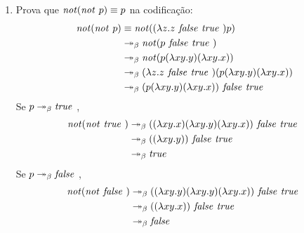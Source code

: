 \documentclass[../main.tex]{subfiles}
\begin{document}
\begin{enumerate}
    \item Prova que $\text{\emph{not}}(\text{\emph{not }} p)\equiv p$ na codificação:
    \begin{equation*}
        \begin{split}
            \text{\emph{not}}(\text{\emph{not }} p) & \equiv \text{\emph{not}}((\lambda z . z \text{\emph{ false }} \text{\emph{true }}) p)
                                   \\ & \twoheadrightarrow_{\beta} \text{\emph{not}}(p \text{\emph{ false }} \text{\emph{true }})
                                   \\ & \twoheadrightarrow_{\beta} \text{\emph{not}}(p (\lambda xy . y) (\lambda xy . x))
                                   \\ & \twoheadrightarrow_{\beta} (\lambda z . z \text{\emph{ false }} \text{\emph{true }})(p (\lambda xy . y) (\lambda xy . x))
                                   \\ & \twoheadrightarrow_{\beta} (p (\lambda xy . y) (\lambda xy . x)) \text{\emph{ false }} \text{\emph{true }}
        \end{split}
    \end{equation*}
    Se $p \twoheadrightarrow_{\beta} \text{\emph{true }}$,
    \begin{equation*}
        \begin{split}
            \text{\emph{not}}(\text{\emph{not }} \text{\emph{true }}) & \twoheadrightarrow_{\beta} ((\lambda xy . x) (\lambda xy . y) (\lambda xy . x)) \text{\emph{ false }} \text{\emph{true }} \\ & \twoheadrightarrow_{\beta} ((\lambda xy . y)) \text{\emph{ false }} \text{\emph{true }} \\ & \twoheadrightarrow_{\beta} \text{\emph{true }}
        \end{split}
    \end{equation*}
    Se $p \twoheadrightarrow_{\beta} \text{\emph{false }}$,
    \begin{equation*}
        \begin{split}
            \text{\emph{not}}(\text{\emph{not }} \text{\emph{false }}) & \twoheadrightarrow_{\beta} ((\lambda xy . y) (\lambda xy . y) (\lambda xy . x)) \text{\emph{ false }} \text{\emph{true }} \\ & \twoheadrightarrow_{\beta} ((\lambda xy . x)) \text{\emph{ false }} \text{\emph{true }} \\ & \twoheadrightarrow_{\beta} \text{\emph{false }}
        \end{split}
    \end{equation*}
\end{enumerate}
\end{document}
